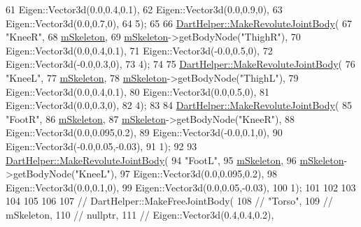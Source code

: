 \begin{DoxyCode}
{61         Eigen::Vector3d(0.0,0.4,0.1),
62         Eigen::Vector3d(0.0,0.9,0),
63         Eigen::Vector3d(0.0,0.7,0),
64         5);
65 
66     \hyperlink{namespace_v_p_c_1_1_dart_helper_a4cf2225ca4d44189f0f0f390cf7aff99}{DartHelper::MakeRevoluteJointBody}(
67         \textcolor{stringliteral}{"KneeR"},
68         \hyperlink{class_v_p_c_1_1_character_afbd0d7d0c6227cabd47de1a5c2d7c039}{mSkeleton},
69         \hyperlink{class_v_p_c_1_1_character_afbd0d7d0c6227cabd47de1a5c2d7c039}{mSkeleton}->getBodyNode(\textcolor{stringliteral}{"ThighR"}),
70         Eigen::Vector3d(0.0,0.4,0.1),
71         Eigen::Vector3d(-0.0,0.5,0),
72         Eigen::Vector3d(-0.0,0.3,0),
73         4);
74 
75     \hyperlink{namespace_v_p_c_1_1_dart_helper_a4cf2225ca4d44189f0f0f390cf7aff99}{DartHelper::MakeRevoluteJointBody}(
76         \textcolor{stringliteral}{"KneeL"},
77         \hyperlink{class_v_p_c_1_1_character_afbd0d7d0c6227cabd47de1a5c2d7c039}{mSkeleton},
78         \hyperlink{class_v_p_c_1_1_character_afbd0d7d0c6227cabd47de1a5c2d7c039}{mSkeleton}->getBodyNode(\textcolor{stringliteral}{"ThighL"}),
79         Eigen::Vector3d(0.0,0.4,0.1),
80         Eigen::Vector3d(0.0,0.5,0),
81         Eigen::Vector3d(0.0,0.3,0),
82         4);
83 
84     \hyperlink{namespace_v_p_c_1_1_dart_helper_a4cf2225ca4d44189f0f0f390cf7aff99}{DartHelper::MakeRevoluteJointBody}(
85         \textcolor{stringliteral}{"FootR"},
86         \hyperlink{class_v_p_c_1_1_character_afbd0d7d0c6227cabd47de1a5c2d7c039}{mSkeleton},
87         \hyperlink{class_v_p_c_1_1_character_afbd0d7d0c6227cabd47de1a5c2d7c039}{mSkeleton}->getBodyNode(\textcolor{stringliteral}{"KneeR"}),
88         Eigen::Vector3d(0.0,0.095,0.2),
89         Eigen::Vector3d(-0.0,0.1,0),
90         Eigen::Vector3d(-0.0,0.05,-0.03),
91         1);
92 
93     \hyperlink{namespace_v_p_c_1_1_dart_helper_a4cf2225ca4d44189f0f0f390cf7aff99}{DartHelper::MakeRevoluteJointBody}(
94         \textcolor{stringliteral}{"FootL"},
95         \hyperlink{class_v_p_c_1_1_character_afbd0d7d0c6227cabd47de1a5c2d7c039}{mSkeleton},
96         \hyperlink{class_v_p_c_1_1_character_afbd0d7d0c6227cabd47de1a5c2d7c039}{mSkeleton}->getBodyNode(\textcolor{stringliteral}{"KneeL"}),
97         Eigen::Vector3d(0.0,0.095,0.2),
98         Eigen::Vector3d(0.0,0.1,0),
99         Eigen::Vector3d(0.0,0.05,-0.03),
100         1);
101 
102 
103 
104 
105 
106 
107     \textcolor{comment}{// DartHelper::MakeFreeJointBody(}
108     \textcolor{comment}{//  "Torso",}
109     \textcolor{comment}{//  mSkeleton,}
110     \textcolor{comment}{//  nullptr,}
111     \textcolor{comment}{//  Eigen::Vector3d(0.4,0.4,0.2),}
}
\end{DoxyCode}
